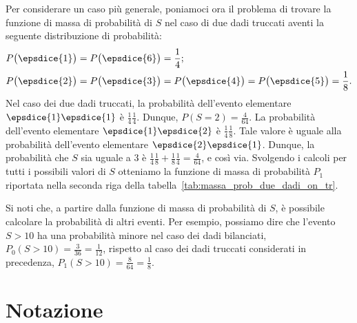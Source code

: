 \begin{exmp}
Per considerare un caso più generale, poniamoci ora il problema di trovare la funzione di massa di probabilità di $S$ nel caso di due dadi truccati aventi la seguente distribuzione di probabilità:
\begin{align}
P\big(\epsdice{1}\big) &= P\big(\epsdice{6}\big) = \frac{1}{4};\notag\\
P\big(\epsdice{2}\big) &= P\big(\epsdice{3}\big) = P\big(\epsdice{4}\big) = P\big(\epsdice{5}\big) = \frac{1}{8}\notag.
\label{eq:loaded_dice}
\end{align}
Nel caso dei due dadi truccati, la probabilità dell'evento elementare $\epsdice{1}\epsdice{1}$ è $\frac{1}{4}\frac{1}{4}$. 
Dunque, $P(S=2) = \frac{4}{64}$. 
La probabilità dell'evento elementare $\epsdice{1}\epsdice{2}$ è $\frac{1}{4}\frac{1}{8}$. 
Tale valore è uguale alla probabilità dell'evento elementare $\epsdice{2}\epsdice{1}$. 
Dunque, la probabilità che $S$ sia uguale a 3 è $\frac{1}{4}\frac{1}{8} + \frac{1}{8}\frac{1}{4} = \frac{4}{64}$, e  così via. 
Svolgendo i calcoli per tutti i possibili valori di $S$ otteniamo la funzione di massa di probabilità $P_1$ riportata nella seconda riga della tabella~\ref{tab:massa_prob_due_dadi_on_tr}. 

Si noti che, a partire dalla funzione di massa di probabilità di $S$, è possibile calcolare la probabilità di altri eventi. 
Per esempio, possiamo dire che l'evento $S > 10$ ha una probabilità minore nel caso dei dadi bilanciati, $P_0(S > 10) = \frac{3}{36} = \frac{1}{12}$, rispetto al caso dei dadi truccati considerati in precedenza, $P_1(S > 10) = \frac{8}{64} = \frac{1}{8}$.

\end{exmp}


\section{Notazione}

